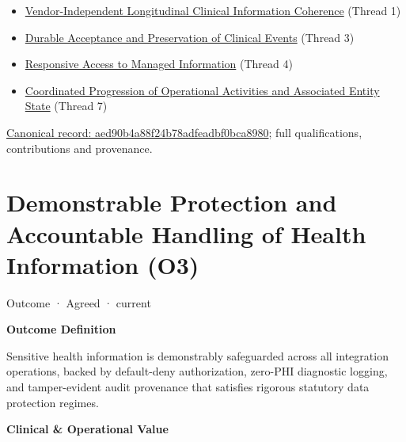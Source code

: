 \begin{itemize}


\item \href{\detokenize{../../../../../docs/markdown/01-motivation/goals-outcomes/strategic-goals.md}}{Vendor-Independent Longitudinal Clinical Information Coherence} (Thread 1)

\item \href{\detokenize{../../../../../docs/markdown/01-motivation/goals-outcomes/strategic-goals.md}}{Durable Acceptance and Preservation of Clinical Events} (Thread 3)

\item \href{\detokenize{../../../../../docs/markdown/01-motivation/goals-outcomes/strategic-goals.md}}{Responsive Access to Managed Information} (Thread 4)

\item \href{\detokenize{../../../../../docs/markdown/01-motivation/goals-outcomes/strategic-goals.md}}{Coordinated Progression of Operational Activities and Associated Entity State} (Thread 7)

\end{itemize}

{\footnotesize \href{../../../../continuum/motivation/outcome/aed90b4a88f24b78adfeadbf0bca8980.md}{Canonical record: aed90b4a88f24b78adfeadbf0bca8980}; full qualifications, contributions and provenance.}\par
\section{Demonstrable Protection and Accountable Handling of Health Information (O3)}

\label{element:75519ed8f7de4a619cc9065f525d703a}
{\small Outcome · Agreed · current}\par

\par\medskip\textbf{Outcome Definition}\par


Sensitive health information is demonstrably safeguarded across all integration operations, backed by default-deny authorization, zero-PHI diagnostic logging, and tamper-evident audit provenance that satisfies rigorous statutory data protection regimes.



\par\medskip\textbf{Clinical \& Operational Value}\par


